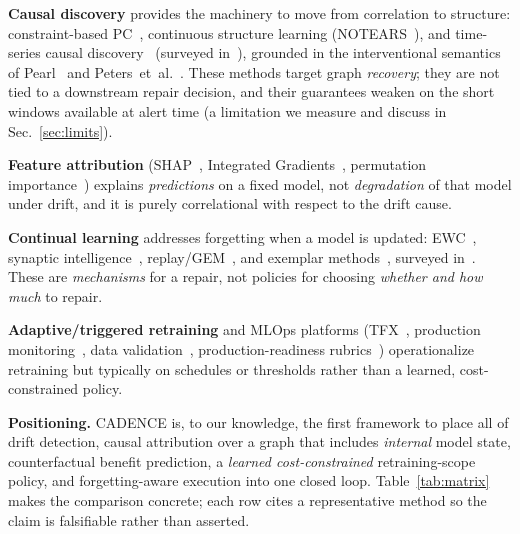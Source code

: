 \documentclass[conference]{IEEEtran}
\begin{document}
\textbf{Causal discovery} provides the machinery to move from correlation
to structure: constraint-based PC~\cite{spirtes2000causation}, continuous
structure learning (NOTEARS~\cite{zheng2018notears}), and time-series
causal discovery~\cite{runge2019pcmci} (surveyed in~\cite{glymour2019review}),
grounded in the interventional
semantics of Pearl~\cite{pearl2009causality} and
Peters~et~al.~\cite{peters2017elements}. These methods target graph
\emph{recovery}; they are not tied to a downstream repair decision, and
their guarantees weaken on the short windows available at alert time
(a limitation we measure and discuss in Sec.~\ref{sec:limits}).

\textbf{Feature attribution} (SHAP~\cite{lundberg2017shap}, Integrated
Gradients~\cite{sundararajan2017ig}, permutation
importance~\cite{breiman2001random}) explains \emph{predictions} on a
fixed model, not \emph{degradation} of that model under drift, and it is
purely correlational with respect to the drift cause.

\textbf{Continual learning} addresses forgetting when a model is updated:
EWC~\cite{kirkpatrick2017ewc}, synaptic
intelligence~\cite{zenke2017si}, replay/GEM~\cite{lopezpaz2017gem}, and
exemplar methods~\cite{rebuffi2017icarl}, surveyed
in~\cite{delange2021continual}. These are \emph{mechanisms} for a repair,
not policies for choosing \emph{whether and how much} to repair.

\textbf{Adaptive/triggered retraining} and MLOps platforms
(TFX~\cite{baylor2017tfx}, production monitoring~\cite{klaise2020monitoring},
data validation~\cite{polyzotis2019data}, production-readiness
rubrics~\cite{breck2017mltest}) operationalize retraining but
typically on schedules or thresholds rather than a learned,
cost-constrained policy.

\textbf{Positioning.} CADENCE is, to our knowledge, the first framework to
place all of drift detection, causal attribution over a graph that
includes \emph{internal} model state, counterfactual benefit prediction,
a \emph{learned cost-constrained} retraining-scope policy, and
forgetting-aware execution into one closed loop. Table~\ref{tab:matrix}
makes the comparison concrete; each row cites a representative method so
the claim is falsifiable rather than asserted.
\end{document}
